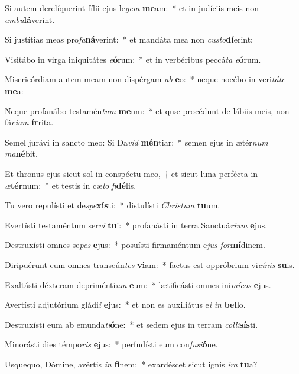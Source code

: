\item Si autem derelíquerint fílii ejus le\textit{gem} \textbf{me}am:~* et in judíciis meis non \textit{am}\textit{bu}\textbf{lá}verint.
\item Si justítias meas pro\textit{fa}\textbf{ná}verint:~* et mandáta mea non \textit{cus}\textit{to}\textbf{dí}erint:
\item Visitábo in virga iniquitátes \textit{e}\textbf{ó}rum:~* et in verbéribus peccá\textit{ta} \textit{e}\textbf{ó}rum.
\item Misericórdiam autem meam non dispérgam \textit{ab} \textbf{e}o:~* neque nocébo in veri\textit{tá}\textit{te} \textbf{me}a:
\item Neque profanábo testamén\textit{tum} \textbf{me}um:~* et quæ procédunt de lábiis meis, non fá\textit{ci}\textit{am} \textbf{ír}rita.
\item Semel jurávi in sancto meo: Si Da\textit{vid} \textbf{mén}tiar:~* semen ejus in ætér\textit{num} \textit{ma}\textbf{né}bit.
\item Et thronus ejus sicut sol in conspéctu meo,~† et sicut luna perfécta in \textit{æ}\textbf{tér}num:~* et testis in cæ\textit{lo} \textit{fi}\textbf{dé}lis.
\item Tu vero repulísti et de\textit{spe}\textbf{xís}ti:~* distulísti \textit{Chris}\textit{tum} \textbf{tu}um.
\item Evertísti testaméntum ser\textit{vi} \textbf{tu}i:~* profanásti in terra Sanctuá\textit{ri}\textit{um} \textbf{e}jus.
\item Destruxísti omnes se\textit{pes} \textbf{e}jus:~* posuísti firmaméntum e\textit{jus} \textit{for}\textbf{mí}dinem.
\item Diripuérunt eum omnes transeún\textit{tes} \textbf{vi}am:~* factus est oppróbrium vi\textit{cí}\textit{nis} \textbf{su}is.
\item Exaltásti déxteram depriménti\textit{um} \textbf{e}um:~* lætificásti omnes ini\textit{mí}\textit{cos} \textbf{e}jus.
\item Avertísti adjutórium gládi\textit{i} \textbf{e}jus:~* et non es auxiliátus e\textit{i} \textit{in} \textbf{bel}lo.
\item Destruxísti eum ab emunda\textit{ti}\textbf{ó}ne:~* et sedem ejus in terram \textit{col}\textit{li}\textbf{sís}ti.
\item Minorásti dies témpo\textit{ris} \textbf{e}jus:~* perfudísti eum con\textit{fu}\textit{si}\textbf{ó}ne.
\item Usquequo, Dómine, avértis \textit{in} \textbf{fi}nem:~* exardéscet sicut ignis \textit{i}\textit{ra} \textbf{tu}a?

